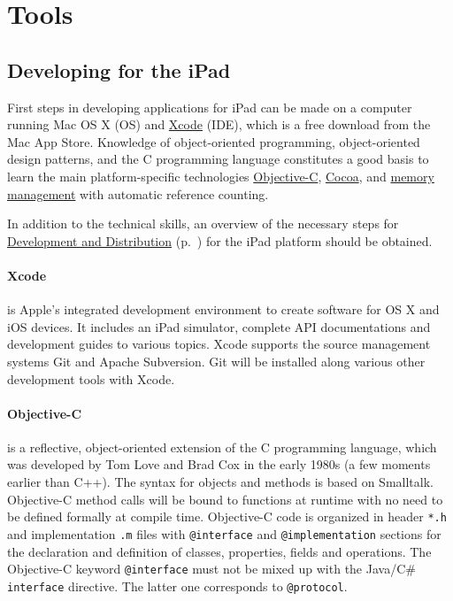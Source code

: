 
\section{Tools}

\subsection{Developing for the iPad}

First steps in developing applications for iPad can be made on a computer running Mac OS X (OS) and 
\href{sec:Xcode}{Xcode} (IDE), which is a free download from the Mac App Store.
Knowledge of object-oriented programming, object-oriented design patterns, 
and the C programming language 
constitutes a good basis to learn the main platform-specific technologies 
\href{sec:ObjC}{Objective-C},
\href{sec:Cocoa}{Cocoa}, and
\href{sec:MemoryManagement}{memory management}
with automatic reference counting.

In addition to the technical skills, an overview of the necessary steps for 
\href{sec:DAD}{Development and Distribution} (p.~\pageref{sec:DAD}) for the iPad platform
should be obtained.

\paragraph{Xcode}
\label{sec:Xcode}
is Apple's integrated development environment to create software for OS X and iOS devices.
It includes an iPad simulator, complete API documentations and development guides to various topics. 
Xcode supports the source management systems Git and Apache Subversion. 
Git will be installed along various other development tools with Xcode.

\paragraph{Objective-C}
\label{sec:ObjC}
is a reflective, object-oriented extension of the C programming language,
which was developed by Tom Love and Brad Cox in the early 1980s (a few moments earlier than C++). 
The syntax for objects and methods is based on Smalltalk. 
Objective-C method calls will be bound to functions at runtime with no need to be defined formally at compile time.
Objective-C code is organized in header \verb=*.h= and implementation \verb+.m+ files 
with \verb+@interface+ and \verb+@implementation+ sections for
the declaration and definition of classes, properties, fields and operations.
The Objective-C keyword \verb+@interface+ must not be mixed up with the Java/C\# \verb+interface+ directive. 
The latter one corresponds to \verb+@protocol+.

